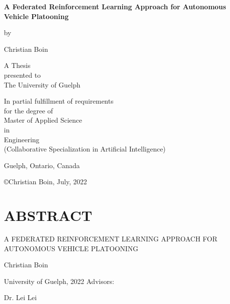 \documentclass[oneside, 12pt]{book}
\let\oldfrontmatter\frontmatter
\gdef\frontmatter{\oldfrontmatter\pagestyle{plain}}
\begin{document}
\frontmatter
\begin{titlepage}
	\setlength{\parskip}{12pt}
	\centering
	{\textbf{\LARGE A Federated Reinforcement Learning Approach for Autonomous Vehicle Platooning}\par}
	\vspace{1.5 cm}
	{by}\par
	{Christian Boin}\par
	\vspace{2cm}
	{A Thesis\\
	presented to\\
	The University of Guelph}\par
	\vspace{2cm}
	{In partial fulfillment of requirements\\
	for the degree of\\
	Master of Applied Science\\
	in\\
	Engineering\\
	(Collaborative Specialization in Artificial Intelligence)}\par
	\vspace{2cm}
	{\normalsize Guelph, Ontario, Canada}\par
	\vspace{0.25cm}
	{\copyright\hspace{6pt}Christian Boin, July, 2022}\par
\end{titlepage}

\addtocounter{page}{1} %

\chapter*{\centering \MakeUppercase{Abstract}}
\thispagestyle{empty} %
\pagestyle{empty} %
\begin{center} A FEDERATED REINFORCEMENT LEARNING APPROACH FOR AUTONOMOUS VEHICLE PLATOONING \end{center}

\noindent Christian Boin

\noindent University of Guelph, 2022   \hfill Advisors: \hspace{1.5cm}

									   \hfill Dr. Lei Lei \hspace{1.20cm}
\end{document}
